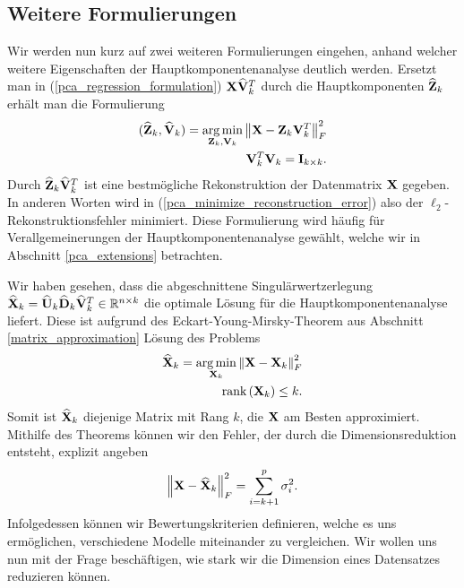\subsection{Weitere Formulierungen} 

Wir werden nun kurz auf zwei weiteren Formulierungen eingehen, anhand welcher weitere Eigenschaften der Hauptkomponentenanalyse deutlich werden. Ersetzt man in (\ref{pca_regression_formulation}) $\mathbf{X} \widehat{\mathbf{V}}_k^T$ durch die Hauptkomponenten $\widehat{\mathbf{Z}}_k$ erhält man die Formulierung
\begin{align}
\label{pca_minimize_reconstruction_error}
\begin{split}
(\widehat{\mathbf{Z}}_k, \widehat{\mathbf{V}}_k) = \operatorname*{arg\,min}_{\mathbf{Z}_k, \mathbf{V}_k} \left\lVert \mathbf{X} - \mathbf{Z}_k \mathbf{V}_k^T \right\rVert_{F}^{2}\\
\mathbf{V}_k^T\mathbf{V}_k = \mathbf{I}_{k \times k}.
\end{split}
\end{align}
Durch $\widehat{\mathbf{Z}}_k \widehat{\mathbf{V}}_k^T$ ist eine bestmögliche Rekonstruktion der Datenmatrix $\mathbf{X}$ gegeben. In anderen Worten wird in (\ref{pca_minimize_reconstruction_error}) also der $\ell_2$-Rekonstruktionsfehler minimiert. Diese Formulierung wird häufig für Verallgemeinerungen der Hauptkomponentenanalyse gewählt, welche wir in Abschnitt \ref{pca_extensions} betrachten.

Wir haben gesehen, dass die abgeschnittene Singulärwertzerlegung $\widehat{\mathbf{X}}_k = \widehat{\mathbf{U}}_k \widehat{\mathbf{D}}_k \widehat{\mathbf{V}}_k^T \in \mathbb{R}^{n \times k}$ die optimale Lösung für die Hauptkomponentenanalyse liefert. Diese ist aufgrund des Eckart-Young-Mirsky-Theorem aus Abschnitt \ref{matrix_approximation} Lösung des Problems
\begin{align}
\label{pca_best_rank_approximation}
\begin{split}
\widehat{\mathbf{X}}_k = \operatorname*{arg\,min}_{\mathbf{X}_k} \left\lVert \mathbf{X} - \mathbf{X}_k \right\rVert_F^2\\
\text{rank} \left( \mathbf{X}_k \right) \leq k.
\end{split}
\end{align}
Somit ist $\widehat{\mathbf{X}}_k$ diejenige Matrix mit Rang $k$, die $\mathbf{X}$ am Besten approximiert. Mithilfe des Theorems können wir den Fehler, der durch die Dimensionsreduktion entsteht, explizit angeben
\begin{align*}
\left\lVert \mathbf{X} - \widehat{\mathbf{X}}_k \right\rVert_F^2 = \sum_{i=k+1}^p \sigma_i^2.
\end{align*}
Infolgedessen können wir Bewertungskriterien definieren, welche es uns ermöglichen, verschiedene Modelle miteinander zu vergleichen. Wir wollen uns nun mit der Frage beschäftigen, wie stark wir die Dimension eines Datensatzes reduzieren können.


